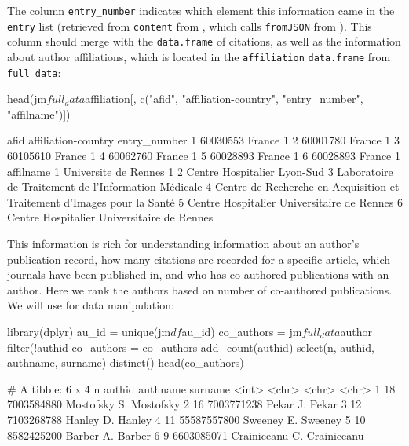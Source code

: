 The column \texttt{entry\_number} indicates which element this
information came in the \texttt{entry} list (retrieved from
\texttt{content} from  \citep{httr}, which calls
\texttt{fromJSON} from  \citep{jsonlite}). This column
should merge with the \texttt{data.frame} of citations, as well as the
information about author affiliations, which is located in the
\texttt{affiliation} \texttt{data.frame} from \texttt{full\_data}:

\begin{Schunk}
\begin{Sinput}
head(jm$full_data$affiliation[, c("afid", "affiliation-country", "entry_number",  "affilname")])
\end{Sinput}
\begin{Soutput}
      afid affiliation-country entry_number
1 60030553              France            1
2 60001780              France            1
3 60105610              France            1
4 60062760              France            1
5 60028893              France            1
6 60028893              France            1
                                                                affilname
1                                                  Universite de Rennes 1
2                                             Centre Hospitalier Lyon-Sud
3                     Laboratoire de Traitement de l'Information Médicale
4 Centre de Recherche en Acquisition et Traitement d'Images pour la Santé
5                              Centre Hospitalier Universitaire de Rennes
6                              Centre Hospitalier Universitaire de Rennes
\end{Soutput}
\end{Schunk}

This information is rich for understanding information about an author's
publication record, how many citations are recorded for a specific
article, which journals have been published in, and who has co-authored
publications with an author. Here we rank the authors based on number of
co-authored publications. We will use  \citep{dplyr} for
data manipulation:

\begin{Schunk}
\begin{Sinput}
library(dplyr)
au_id = unique(jm$df$au_id) 
co_authors = jm$full_data$author %
  filter(!authid %
co_authors = co_authors %
  add_count(authid) %
  select(n, authid, authname, surname) %
  distinct() %
head(co_authors)
\end{Sinput}
\begin{Soutput}
# A tibble: 6 x 4
      n authid      authname       surname    
  <int> <chr>       <chr>          <chr>      
1    18 7003584880  Mostofsky S.   Mostofsky  
2    16 7003771238  Pekar J.       Pekar      
3    12 7103268788  Hanley D.      Hanley     
4    11 55587557800 Sweeney E.     Sweeney    
5    10 8582425200  Barber A.      Barber     
6     9 6603085071  Crainiceanu C. Crainiceanu
\end{Soutput}
\end{Schunk}

